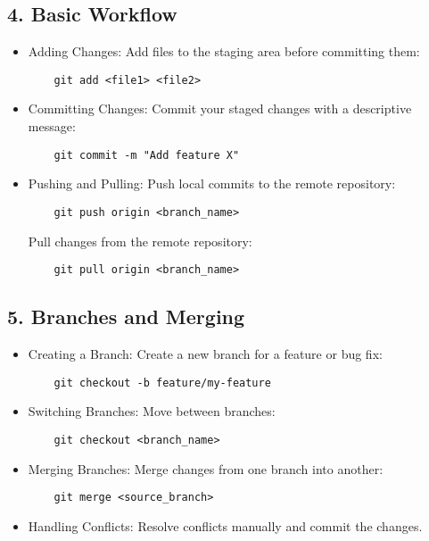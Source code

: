 \documentclass{article}
\begin{document}
\subsection*{4. Basic Workflow}
\begin{itemize}
    \item Adding Changes: Add files to the staging area before committing them:
    \begin{verbatim}
    git add <file1> <file2>
    \end{verbatim}
    \item Committing Changes: Commit your staged changes with a descriptive message:
    \begin{verbatim}
    git commit -m "Add feature X"
    \end{verbatim}
    \item Pushing and Pulling: Push local commits to the remote repository:
    \begin{verbatim}
    git push origin <branch_name>
    \end{verbatim}
    Pull changes from the remote repository:
    \begin{verbatim}
    git pull origin <branch_name>
    \end{verbatim}
\end{itemize}

\subsection*{5. Branches and Merging}
\begin{itemize}
    \item Creating a Branch: Create a new branch for a feature or bug fix:
    \begin{verbatim}
    git checkout -b feature/my-feature
    \end{verbatim}
    \item Switching Branches: Move between branches:
    \begin{verbatim}
    git checkout <branch_name>
    \end{verbatim}
    \item Merging Branches: Merge changes from one branch into another:
    \begin{verbatim}
    git merge <source_branch>
    \end{verbatim}
    \item Handling Conflicts: Resolve conflicts manually and commit the changes.
\end{itemize}
\end{document}
